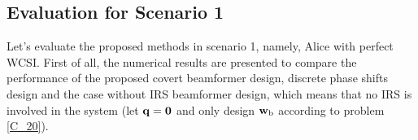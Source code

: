 \documentclass[10pt,journal,letterpaper,twocolumn,twoside]{IEEEtran} %
\begin{document}
%


%
%
\subsection{Evaluation for Scenario 1}
Let's evaluate the proposed methods in scenario 1, namely, Alice with perfect WCSI.
First of all,  the numerical results are presented to compare the performance of the proposed covert beamformer design, discrete phase shifts design and the case without IRS beamformer design, which means that no IRS is involved in the system (let ${\bf{q}}={\bf{0}}$ and only design ${{\mathbf{w}}_{\rm{b}}}$ according to problem  \eqref{C_20}).
\end{document}

